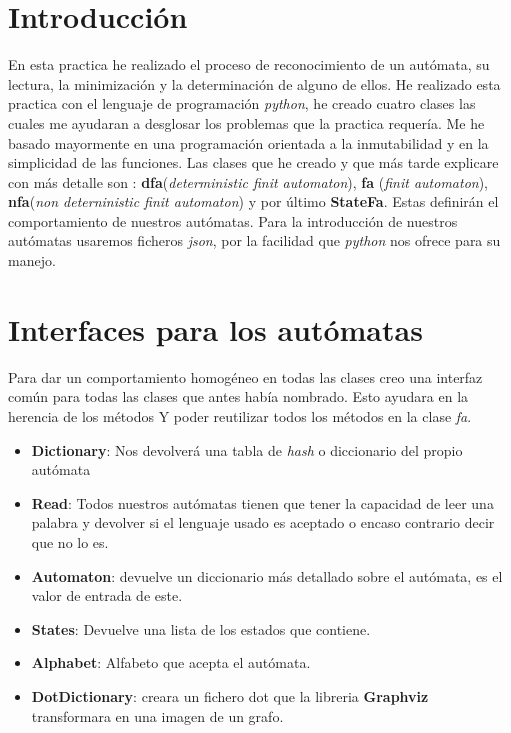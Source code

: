 \documentclass{article}
\begin{document}
    \section{Introducción}\label{sec:introducción}
    En esta practica he realizado el proceso de reconocimiento de un autómata, su lectura, la minimización y la determinación
    de alguno de ellos.
    He realizado esta practica con el lenguaje de programación \textit{python}, he creado cuatro clases las cuales me
    ayudaran a desglosar los problemas que la practica requería.
    Me he basado mayormente en una programación orientada a la inmutabilidad y en la simplicidad de las funciones.
    Las clases que he creado y que más tarde explicare con más detalle son : \textbf{dfa}(\textit{deterministic finit
    automaton}), \textbf{fa} (\textit{finit automaton}), \textbf{nfa}(\textit{non deterninistic finit automaton}) y por
    último  \textbf{StateFa}.
    Estas definirán el comportamiento de nuestros autómatas.
    Para la introducción de nuestros autómatas usaremos ficheros \textit{json}, por la facilidad que \textit{python}
    nos ofrece para su manejo.



    \section{Interfaces para los autómatas}\label{sec:interfaces-para-los-autómatas}
    Para dar un comportamiento homogéneo en todas las clases creo una interfaz común para todas las clases que antes
    había nombrado.
    Esto ayudara en la herencia de los métodos Y poder reutilizar todos los métodos en la clase \textit{fa}.
    \begin{itemize}
        \item \textbf{Dictionary}: Nos devolverá una tabla de \textit{hash} o diccionario del propio autómata
        \item \textbf{Read}: Todos nuestros autómatas tienen que tener la capacidad de leer una palabra y devolver si
        el lenguaje usado es aceptado o encaso contrario decir que no lo es.
        \item \textbf{Automaton}: devuelve un diccionario más detallado sobre el autómata, es el valor de entrada de este.
        \item \textbf{States}: Devuelve una lista de los estados que contiene.
        \item \textbf{Alphabet}: Alfabeto que acepta el autómata.
        \item \textbf{DotDictionary}: creara un fichero dot que la libreria \textbf{Graphviz} transformara en una imagen
        de un grafo.
    \end{itemize}
\end{document}
